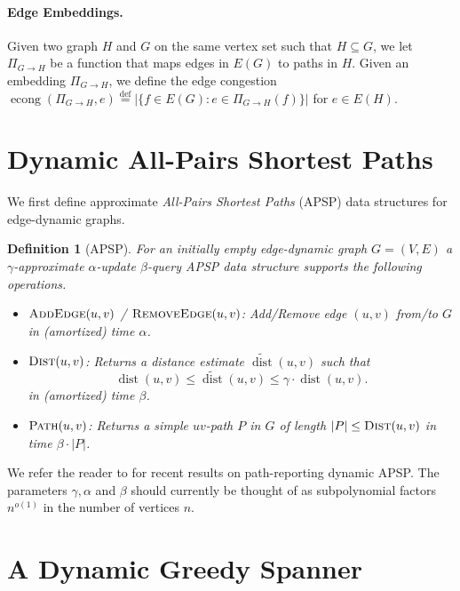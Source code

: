 \documentclass[11pt]{article}
\newtheorem{definition}[theorem]{Definition}
\def\defeq{\stackrel{\mathrm{def}}{=}}
\DeclareMathOperator{\econg}{econg}
\DeclareMathOperator{\dist}{dist}
\begin{document}
\paragraph{Edge Embeddings.} Given two graph $H$ and $G$ on the same vertex set such that $H \subseteq G$, we let $\Pi_{G \rightarrow H}$ be a function that maps edges in $E(G)$ to paths in $H$. Given an embedding $\Pi_{G \rightarrow H}$, we define the edge congestion $\econg(\Pi_{G \rightarrow H}, e) \defeq |\{f \in E(G): e \in \Pi_{G \rightarrow H}(f) \}|$ for $e \in E(H)$.



\section{Dynamic All-Pairs Shortest Paths}

We first define approximate \emph{All-Pairs Shortest Paths} (APSP) data structures for edge-dynamic graphs. 

\begin{definition}[APSP] \label{def:apsp}
    For an initially empty edge-dynamic graph $G = (V, E)$ a $\gamma$-approximate $\alpha$-update $\beta$-query APSP data structure supports the following operations.
    \begin{itemize}
        \item $\textsc{AddEdge}(u,v)$ / $\textsc{RemoveEdge}(u, v)$: Add/Remove edge $(u, v)$ from/to $G$ in (amortized) time $\alpha$.
        \item $\textsc{Dist}(u, v)$: Returns a distance estimate $\widetilde{\dist}(u,v)$ such that
        \begin{equation*}
            \dist(u, v) \leq \widetilde{\dist}(u,v) \leq \gamma \cdot \dist(u,v). 
        \end{equation*}
        in (amortized) time $\beta$.
        \item $\textsc{Path}(u,v)$: Returns a simple $uv$-path $P$ in $G$ of length $|P| \leq \textsc{Dist}(u,v)$ in time $\beta \cdot |P|$. \end{itemize}
\end{definition}

We refer the reader to \cite{CZ23, kyng2023dynamic, haeupler2024dynamicdeterministicconstantapproximatedistance} for recent results on path-reporting dynamic APSP.
The parameters $\gamma, \alpha$ and $\beta$ should currently be thought of as subpolynomial factors $n^{o(1)}$ in the number of vertices $n$. 

\section{A Dynamic Greedy Spanner}
\end{document}
